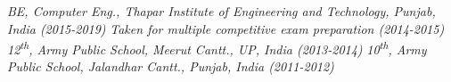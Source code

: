 


\begin{scholarship}
					{ \textit{BE, Computer Eng., Thapar Institute of Engineering and Technology, Punjab, India (2015-2019)} }
					{ \textit{Taken for multiple competitive exam preparation (2014-2015)} }
					{ \textit{12\textsuperscript{th}, Army Public School, Meerut Cantt., UP, India (2013-2014)} }
					{ \textit{10\textsuperscript{th}, Army Public School, Jalandhar Cantt., Punjab, India (2011-2012)} }
\end{scholarship}